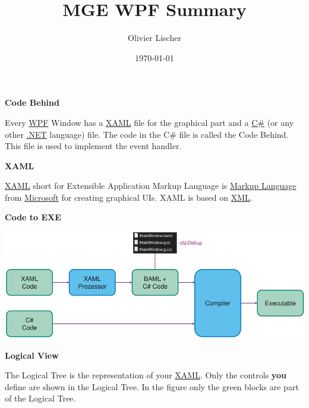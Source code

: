 \documentclass[10pt,twoside,landscape]{article}
\author{Olivier Lischer}
\date{\today}
\title{MGE WPF Summary}
\begin{document}
\begin{multicols}{4}

\textbf{Code Behind}

Every \href{../../../roam/20211123162923-wpf.org}{WPF} Window has a \href{../../../roam/20211123162058-xaml.org}{XAML} file for the graphical part and a \href{../../../roam/20211003114158-c.org}{C\#} (or any other \href{../../../roam/20211003114703-net.org}{.NET} language) file.
The code in the C\# file is called the Code Behind.
This file is used to implement the event handler.

\textbf{XAML}

\href{../../../roam/20211123162058-xaml.org}{XAML} short for Extensible Application Markup Language is \href{../../../roam/20211123161400-markup_language.org}{Markup Language} from \href{../../../roam/20211123161417-microsoft.org}{Microsoft} for creating graphical UIs.
XAML is based on \href{../../../roam/20211112100344-xml.org}{XML}.

\textbf{Code to EXE}

\begin{center}
\includegraphics[width=.9\linewidth]{img/xaml_to_application.png}
\end{center}

\textbf{Logical View}

The Logical Tree is the representation of your \href{../../../roam/20211123162058-xaml.org}{XAML}.
Only the controls \textbf{you} define are shown in the Logical Tree.
In the figure only the green blocks are part of the Logical Tree.


\end{multicols}
\end{document}
